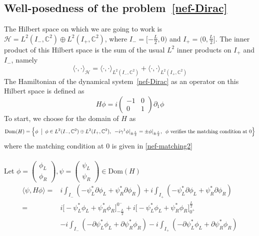 \subsection{Well-posedness of the problem~\cref{nef-Dirac}}\label{vacuum-subsect-sa}
The Hilbert space on which we are going to work is $\mathcal{H} = L^{2}(I_-, \mathbb{C}^2) \oplus L^{2}(I_+, \mathbb{C}^2)$,  where $I_- = [-\frac{L}{2}, 0)$ and $I_+ = (0, \frac{L}{2}]$.
The inner product of this Hilbert space is the sum of the usual $L^2$ inner products on $I_+$ and $I_-$, namely
\begin{equation*}
\langle \cdot, \cdot\rangle_{\mathcal{H} } = \langle \cdot, \cdot\rangle_{L^{2}(I_-, \mathbb{C}^2)} +\langle \cdot, \cdot\rangle_{L^{2}(I_+, \mathbb{C}^2)}
\end{equation*}
The Hamiltonian of the dynamical system~\cref{nef-Dirac} as an operator on this Hilbert space is defined as
\begin{equation}
H \phi = i \begin{pmatrix}
-1  &  0 \\
0  &  1  \end{pmatrix} \partial_1 \phi 
\end{equation}
To start, we choose for the domain of $H$ as 
\begin{equation*}
\mathrm{Dom}(H) = \Big \{\phi \enskip \big\vert \enskip \phi \in L^{2}(I_-, \mathbb{C}^2) \oplus L^{2}(I_+, \mathbb{C}^2), \enskip -i \gamma^1 \phi\vert_{\pm \frac{L}{2}} = \pm \phi \vert_{ \pm \frac{L}{2} }, \enskip \phi \textrm{ verifies the matching condition at 0} \Big \}
\end{equation*} 
where the matching condition at 0 is given in \cref{nef-matching2}\\\\
Let $ \phi = \begin{pmatrix} \phi_L \\ \phi_R \end{pmatrix}, \psi = \begin{pmatrix} \psi_L \\ \psi_R \end{pmatrix} \in \mathrm{Dom}(H)$
\begin{equation}\label{sa-hamiltonian}
\begin{split}
\langle \psi, H \phi \rangle = & i \int_{I_-} ( - \psi_L^* \partial \phi_L + \psi_R^* \partial \phi_R )
+ i \int_{I_+} ( - \psi_L^* \partial \phi_L + \psi_R^* \partial \phi_R ) \\
= & i \big[-\psi_L^* \phi_L + \psi_R^* \phi_R \big]^{0^-}_{-\frac{L}{2}} + i \big[-\psi_L^* \phi_L + \psi_R^* \phi_R \big]_{0^+}^{\frac{L}{2}} \\
& - i \int_{I_-} ( - \partial \psi_L^* \phi_L + \partial \psi_R^*  \phi_R ) - i \int_{I_+} ( - \partial \psi_L^* \phi_L + \partial \psi_R^*  \phi_R ) 
\end{split}
\end{equation}
